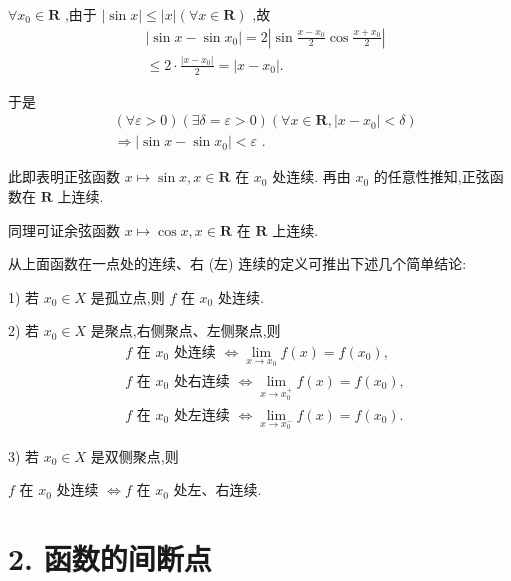 $\forall {x}_{0} \in  \mathbf{R}$ ,由于 $\left| {\sin x}\right|  \leq  \left| x\right| \left( {\forall x \in  \mathbf{R}}\right)$ ,故
\begin{align*}
	&\left| {\sin x - \sin {x}_{0}}\right|  = 2\left| {\sin \frac{x - {x}_{0}}{2}\cos \frac{x + {x}_{0}}{2}}\right|\\
	&\leq  2 \cdot  \frac{\left| x - {x}_{0}\right| }{2} = \left| {x - {x}_{0}}\right| .
\end{align*}

于是
\begin{align*}
	&\left( {\forall \varepsilon  > 0}\right) \left( {\exists \delta  = \varepsilon  > 0}\right) \left( {\forall x \in  \mathbf{R},\left| {x - {x}_{0}}\right|  < \delta }\right)\\
	&\Rightarrow  \left| {\sin x - \sin {x}_{0}}\right|  < \varepsilon \text{ . }
\end{align*}

此即表明正弦函数 $x \mapsto  \sin x,x \in  \mathbf{R}$ 在 ${x}_{0}$ 处连续. 再由 ${x}_{0}$ 的任意性推知,正弦函数在 $\mathbf{R}$ 上连续.

同理可证余弦函数 $x \mapsto  \cos x,x \in  \mathbf{R}$ 在 $\mathbf{R}$ 上连续.

从上面函数在一点处的连续、右 (左) 连续的定义可推出下述几个简单结论:

1) 若 ${x}_{0} \in  X$ 是孤立点,则 $f$ 在 ${x}_{0}$ 处连续.

2) 若 ${x}_{0} \in  X$ 是聚点,右侧聚点、左侧聚点,则
\begin{align*}
	&f\text{ 在 }{x}_{0}\text{ 处连续 } \Leftrightarrow  \mathop{\lim }\limits_{{x \rightarrow  {x}_{0}}}f\left( x\right)  = f\left( {x}_{0}\right) ,\\
	&f\text{ 在 }{x}_{0}\text{ 处右连续 } \Leftrightarrow  \mathop{\lim }\limits_{{x \rightarrow  {x}_{0}^{ + }}}f\left( x\right)  = f\left( {x}_{0}\right) ,\\
	&f\text{ 在 }{x}_{0}\text{ 处左连续 } \Leftrightarrow  \mathop{\lim }\limits_{{x \rightarrow  {x}_{0}^{ - }}}f\left( x\right)  = f\left( {x}_{0}\right) .
\end{align*}

3) 若 ${x}_{0} \in  X$ 是双侧聚点,则

$f$ 在 ${x}_{0}$ 处连续 $\Leftrightarrow  f$ 在 ${x}_{0}$ 处左、右连续.

\section*{2. 函数的间断点}

